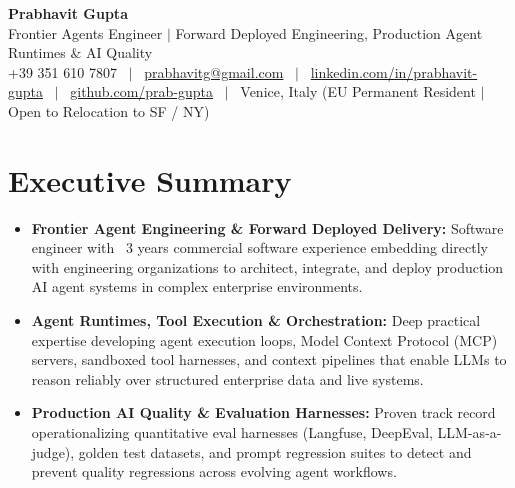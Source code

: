 \documentclass[a4paper,10pt]{article}
\begin{document}
\begin{minipage}[c]{0.80\textwidth}
  {\Huge\bfseries Prabhavit Gupta}\\[3pt]
  {\color{accent}\large Frontier Agents Engineer $\vert$ Forward Deployed Engineering, Production Agent Runtimes $\&$ AI Quality}\\[6pt]
  {\footnotesize +39 351 610 7807 ~$\vert$~
  \href{mailto:prabhavitg@gmail.com}{prabhavitg@gmail.com} ~$\vert$~
  \href{https://www.linkedin.com/in/prabhavit-gupta}{linkedin.com/in/prabhavit-gupta} ~$\vert$~
  \href{https://github.com/prab-gupta}{github.com/prab-gupta} ~$\vert$~
  Venice, Italy (EU Permanent Resident $\vert$ Open to Relocation to SF / NY)}
\end{minipage}\hfill

\vspace{6pt}

\section{Executive Summary}
\begin{itemize}
  \item \textbf{Frontier Agent Engineering \& Forward Deployed Delivery:} Software engineer with ~3 years commercial software experience embedding directly with engineering organizations to architect, integrate, and deploy production AI agent systems in complex enterprise environments.
  \item \textbf{Agent Runtimes, Tool Execution \& Orchestration:} Deep practical expertise developing agent execution loops, Model Context Protocol (MCP) servers, sandboxed tool harnesses, and context pipelines that enable LLMs to reason reliably over structured enterprise data and live systems.
  \item \textbf{Production AI Quality \& Evaluation Harnesses:} Proven track record operationalizing quantitative eval harnesses (Langfuse, DeepEval, LLM-as-a-judge), golden test datasets, and prompt regression suites to detect and prevent quality regressions across evolving agent workflows.
\end{itemize}

\end{document}
